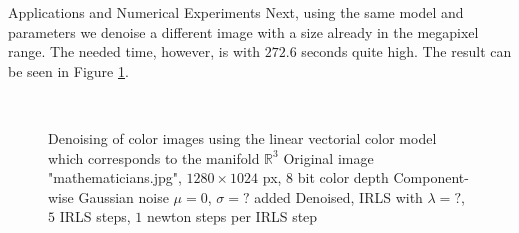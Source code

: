 \begin{chapter}{Applications and Numerical Experiments}
Next, using the same model and parameters we denoise a different image with a size already in the megapixel range. The needed
time, however, is with $272.6$ seconds quite high. The result can be seen in Figure \ref{fig:application_color2}.\\

\begin{figure}[h!]
    \centering
    \\
    \caption[Large image "mathematicians" linear-vectorial denoising]{Denoising of color images using the linear vectorial color model which corresponds to the manifold $\mathbb{R}^3$
	 Original image "mathematicians.jpg", $1280\times 1024$ px, 8 bit color depth
	 Component-wise Gaussian noise $\mu=0$, $\sigma=?$ added
	 Denoised, IRLS with $\lambda=?$, $5$ IRLS steps, $1$ newton steps per IRLS step
	\label{fig:application_color2}
    }
\end{figure}


\end{chapter}
